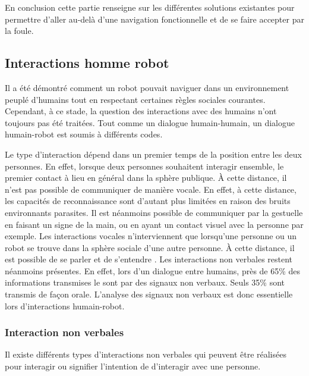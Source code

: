 En conclusion cette partie renseigne sur les différentes solutions existantes pour permettre d'aller au-delà d'une navigation fonctionnelle et de se faire accepter par la foule. 

\subsection{Interactions homme robot}

Il a été démontré comment un robot pouvait naviguer dans un environnement peuplé d'humains tout en respectant certaines règles sociales courantes. Cependant, à ce stade, la question des interactions avec des humains n'ont toujours pas été traitées. Tout comme un dialogue humain-humain, un dialogue humain-robot est soumis à différents codes. 

Le type d’interaction dépend dans un premier temps de la position entre les deux personnes. En effet, lorsque deux personnes souhaitent interagir ensemble, le premier contact à lieu en général dans la sphère publique. À cette distance, il n’est pas possible de communiquer de manière vocale. En effet, à cette distance, les capacités de reconnaissance sont d’autant plus limitées en raison des bruits environnants parasites. Il est néanmoins possible de communiquer par la gestuelle en faisant un signe de la main, ou en ayant un contact visuel avec la personne par exemple. Les interactions vocales n’interviennent que lorsqu’une personne ou un robot se trouve dans la sphère sociale d’une autre personne. À cette distance, il est possible de se parler et de s’entendre \cite{satake_how_2009}. Les interactions non verbales restent néanmoins présentes. En effet, lors d’un dialogue entre humains, près de 65\% des informations transmises le sont par des signaux non verbaux. Seuls 35\% sont transmis de façon orale. L’analyse des signaux non verbaux est donc essentielle lors d’interactions humain-robot. 

\subsubsection{Interaction non verbales}

Il existe différents types d’interactions non verbales qui peuvent être réalisées pour interagir ou signifier l’intention de d'interagir avec une personne. 

